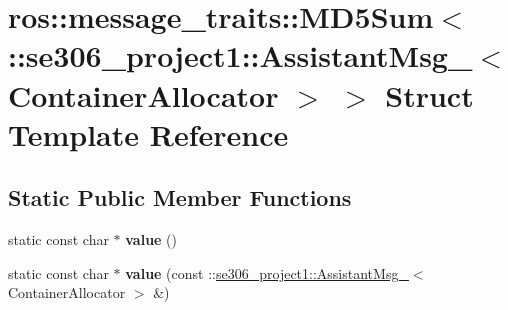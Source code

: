 \hypertarget{structros_1_1message__traits_1_1MD5Sum_3_01_1_1se306__project1_1_1AssistantMsg___3_01ContainerAllocator_01_4_01_4}{\section{ros\-:\-:message\-\_\-traits\-:\-:M\-D5\-Sum$<$ \-:\-:se306\-\_\-project1\-:\-:Assistant\-Msg\-\_\-$<$ Container\-Allocator $>$ $>$ Struct Template Reference}
\label{structros_1_1message__traits_1_1MD5Sum_3_01_1_1se306__project1_1_1AssistantMsg___3_01ContainerAllocator_01_4_01_4}
}
\subsection*{Static Public Member Functions}
\begin{DoxyCompactItemize}
\item 
\hypertarget{structros_1_1message__traits_1_1MD5Sum_3_01_1_1se306__project1_1_1AssistantMsg___3_01ContainerAllocator_01_4_01_4_a696176a6340716bab35810ff1ca89423}{static const char $\ast$ {\bfseries value} ()}\label{structros_1_1message__traits_1_1MD5Sum_3_01_1_1se306__project1_1_1AssistantMsg___3_01ContainerAllocator_01_4_01_4_a696176a6340716bab35810ff1ca89423}

\item 
\hypertarget{structros_1_1message__traits_1_1MD5Sum_3_01_1_1se306__project1_1_1AssistantMsg___3_01ContainerAllocator_01_4_01_4_a1d6448fa9fe928c2c9afcb0e564f975e}{static const char $\ast$ {\bfseries value} (const \-::\hyperlink{structse306__project1_1_1AssistantMsg__}{se306\-\_\-project1\-::\-Assistant\-Msg\-\_\-}$<$ Container\-Allocator $>$ \&)}\label{structros_1_1message__traits_1_1MD5Sum_3_01_1_1se306__project1_1_1AssistantMsg___3_01ContainerAllocator_01_4_01_4_a1d6448fa9fe928c2c9afcb0e564f975e}

\end{DoxyCompactItemize}
